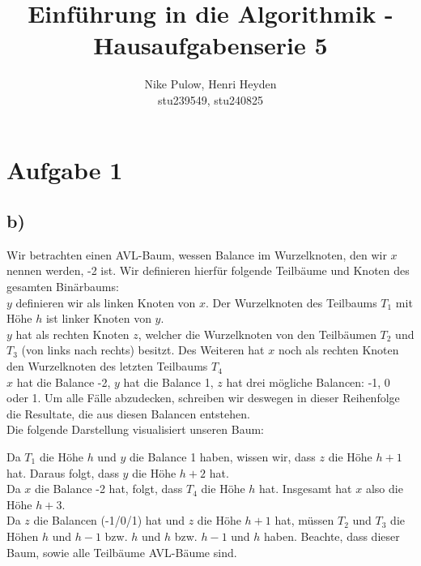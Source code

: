 \documentclass[12pt, a4paper]{article}
\title{Einführung in die Algorithmik - Hausaufgabenserie 5}
\author{Nike Pulow, Henri Heyden\\ \small stu239549, stu240825}
\date{}
\begin{document}
\maketitle

\section*{Aufgabe 1}
\subsection*{b)}
Wir betrachten einen AVL-Baum, wessen Balance im Wurzelknoten, den wir \(x\) nennen werden, -2 ist.
Wir definieren hierfür folgende Teilbäume und Knoten des gesamten Binärbaums:\\
\(y\) definieren wir als linken Knoten von \(x\).
Der Wurzelknoten des Teilbaums \(T_1\) mit Höhe \(h\) ist linker Knoten von \(y\).\\
\(y\) hat als rechten Knoten \(z\), welcher die Wurzelknoten von den Teilbäumen \(T_2\) und \(T_3\) (von links nach rechts) besitzt. Des Weiteren hat \(x\) noch als rechten Knoten den Wurzelknoten des letzten Teilbaums \(T_4\)\\
\(x\) hat die Balance -2, \(y\) hat die Balance 1, \(z\) hat drei mögliche Balancen: -1, 0 oder 1. Um alle Fälle abzudecken, schreiben wir deswegen in dieser Reihenfolge die Resultate, die aus diesen Balancen entstehen.\\
Die folgende Darstellung visualisiert unseren Baum:\\
\begin{center}
\end{center}
Da \(T_1\) die Höhe \(h\) und \(y\) die Balance 1 haben, wissen wir, dass \(z\) die Höhe \(h + 1\) hat. Daraus folgt, dass \(y\) die Höhe \(h+2\) hat.\\
Da \(x\) die Balance -2 hat, folgt, dass \(T_4\) die Höhe \(h\) hat. Insgesamt hat \(x\) also die Höhe \(h+3\).\\
Da \(z\) die Balancen (-1/0/1) hat und \(z\) die Höhe \(h+1\) hat, müssen \(T_2\) und \(T_3\) die Höhen \(h\) und \(h-1\) bzw. \(h\) und \(h\) bzw. \(h-1\) und \(h\) haben.
Beachte, dass dieser Baum, sowie alle Teilbäume AVL-Bäume sind.\\
\end{document}
